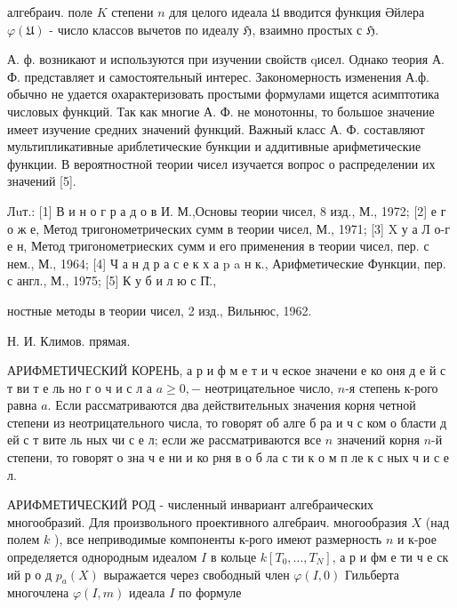 \documentclass[10pt]{article}
\begin{document}
алгебраич. поле $K$ степени $n$ для целого идеала $\mathfrak{U}$ вводится функция Әйлера $\varphi(\mathfrak{U})$ - число классов вычетов по идеалу $\mathfrak{H}$, взаимно простых с $\mathfrak{H}$.



А. ф. возникают и используются при изучении свойств qисел. Однако теория А. Ф. представляет и самостоятельный интерес. Закономерность изменения А.ф. обычно не удается охарактеризовать простыми формулами ищется асимптотика числовых функций. Так как многие А. Ф. не монотонны, то большое значение имеет изучение средних значений функций. Важный класс А. Ф. составляют мультипликативные ариблетические бункции и аддитивные арифметические функции. В вероятностной теории чисел изучается вопрос о распределении их значений [5].



Лuт.: [1] В и н о г р а д о в И. М.,Основы теории чисел, 8 изд., М., 1972; [2] е г о ж е, Метод тригонометрических сумм в теории чисел, М., 1971; [3] X у а Л о-г е н, Метод тригонометриеских сумм и его применения в теории чисел, пер. с нем., М., 1964; [4] Ч а н д р а с е к х а p a н к., Арифметические Функции, пер. с англ., М., 1975; [5] К у б и л ю с П̈.,

ностные методы в теории чисел, 2 изд., Вильнюс, 1962.



Н. И. Климов. прямая.



АРИФМЕТИЧЕСКИЙ КОРЕНЬ, а $р$ и ф м е т и ч еское значени е ко оня д е й с т ви т е ль но г о ч и с л а $a \geqslant 0,-$ неотрицательное число, $n$-я степень к-рого равна $a$. Если рассматриваются два действительных значения корня четной степени из неотрицательного числа, то говорят об алге б ра и ч с ком о бласти д ей с т вите ль ных чи с е л; если же рассматриваются все $n$ значений корня $n$-й степени, то говорят о зна ч е ни и ко рня в о б ла с ти к о м п ле к с ных ч и с е л.



АРИФМЕТИЧЕСКИЙ РОД - численный инвариант алгебраических многообразий. Для произвольного проективного алгебраич. многообразия $X$ (над полем $k$ ), все неприводимые компоненты к-рого имеют размерность $n$ и к-рое определяется однородным идеалом $I$ в кольце $k\left[T_{0}, \ldots, T_{N}\right]$, а р и фм е ти ч е ск ий р о д $p_{a}(X)$ выражается через свободный член $\varphi(I, 0)$ Гильберта многочлена $\varphi(I, m)$ идеала $I$ по формуле
\end{document}
